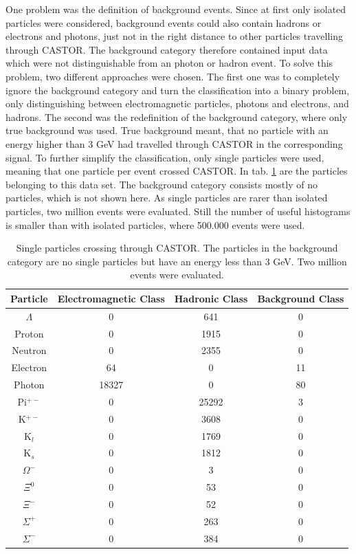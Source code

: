 One problem was the definition of background events. Since at first only isolated particles were considered, background events could also contain hadrons or electrons and photons, just not in the right distance to other particles travelling through CASTOR. The background category therefore contained input data which were not distinguishable from an photon or hadron event. To solve this problem, two different approaches were chosen. The first one was to completely ignore the background category and turn the classification into a binary problem, only distinguishing between electromagnetic particles, photons and electrons, and hadrons. The second was the redefinition of the background category, where only true background was used. True background meant, that no particle with an energy higher than 3 GeV had travelled through CASTOR in the corresponding signal. To further simplify the classification, only single particles were used, meaning that one particle per event crossed CASTOR. In tab. \ref{singleparticles} are the particles belonging to this data set. The background category consists mostly of no particles, which is not shown here. As single particles are rarer than isolated particles, two million events were evaluated. Still the number of useful histograms is smaller than with isolated particles, where 500.000 events were used.

\begin{table}
\centering
\caption{Single particles crossing through CASTOR. The particles in the background category are no single particles but have an energy less than 3 GeV. Two million events were evaluated.}
\sffamily
\begin{tabular}{cccc}\hline
Particle & Electromagnetic Class & Hadronic Class & Background Class \\ \hline
$\Lambda$ & 0 & 641 & 0 \\
Proton & 0 & 1915 & 0 \\
Neutron & 0 & 2355 & 0 \\
Electron  & 64 & 0 & 11 \\
Photon & 18327 & 0 & 80 \\
Pi$^{+-}$ & 0 & 25292 & 3 \\ 
K$^{+-}$ & 0 & 3608 & 0 \\
K$_l$ & 0 & 1769 & 0 \\
K$_s$ & 0 & 1812 & 0 \\
$\Omega^-$ & 0 & 3 & 0 \\
$\Xi^0$ & 0 & 53 & 0 \\
$\Xi^-$ & 0 & 52 & 0 \\
$\Sigma^+$ & 0 & 263 & 0 \\
$\Sigma^-$ & 0 & 384 & 0 \\
\hline
\end{tabular}
\label{singleparticles}
\end{table}


